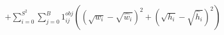 \documentclass[preview]{standalone}
\begin{document}
\begin{align*}
+ \sum_{i=0}^{S^{2}}\sum_{j=0}^{B}1_{ij}^{obj}\left((\sqrt{w_{i}}-\sqrt{\hat{w}_{i}})^{2}+(\sqrt{h_{i}}-\sqrt{\hat{h}_{i}})^{2}\right)
\end{align*}
\end{document}
